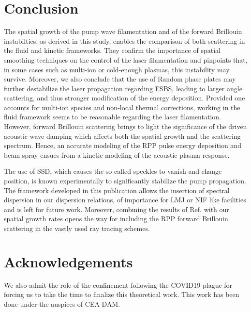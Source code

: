 \documentclass[
 reprint,
 amsmath,amssymb,
 aps,
]{revtex4-1}
\begin{document}
\section{Conclusion}
The spatial growth of the  pump wave filamentation and of the forward Brillouin instabilties, as derived in this study, enables the comparison of both scattering in the fluid and kinetic frameworks. They confirm the importance  of spatial smoothing techniques on the control of the laser filamentation and pinpoints that, in some cases such as multi-ion  or cold-enough  plasmas, this instability may survive.
Moreover, we also conclude that the use of Random phase plates may further destabilize the laser propagation   regarding FSBS,  leading to larger angle scattering, and thus stronger modification of the energy deposition.
Provided one accounts for multi-ion species and non-local thermal corrections, working in the fluid framework seems to be reasonable regarding the laser filamentation. However, forward Brillouin scattering brings to light the significance of   the driven acoustic  wave damping which affects both the spatial growth  and the  scattering spectrum. 
Hence, an accurate modeling of the RPP pulse energy deposition and beam spray ensues from a kinetic modeling of the acoustic plasma response.

The use of SSD, which  causes the so-called speckles to vanish and change position, is known  experimentally to significantly stabilize the pump propagation. The framework developed in this publication  allows the insertion of spectral dispersion in our dispersion relations, of importance for LMJ or NIF like facilities  and is left for future work. Moreover, 
combining the results of  Ref. \cite[]{POP_Debayle_2019} with our spatial growth rates opens the way for 
including the RPP forward Brillouin scattering   in the vastly used ray tracing schemes.


\section*{Acknowledgements}
We also admit the role of the confinement following the COVID19 plague for forcing us to take the time to finalize this theoretical work. This work has been done under the auspices of CEA-DAM. 

\end{document}
